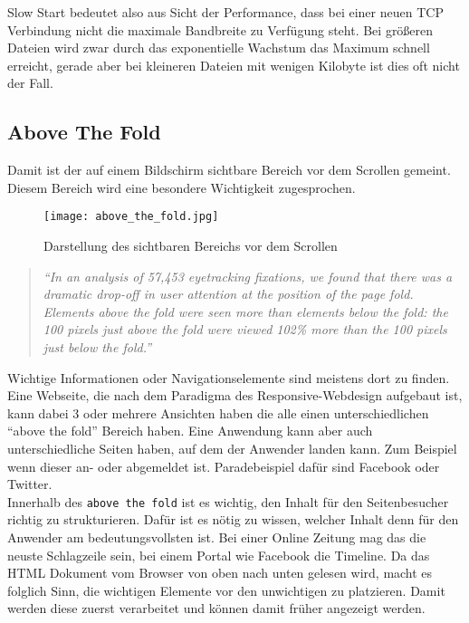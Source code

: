 		Slow Start bedeutet also aus Sicht der Performance, dass bei einer neuen TCP Verbindung nicht die maximale Bandbreite zu Verfügung steht. Bei größeren Dateien wird zwar durch das exponentielle Wachstum das Maximum schnell erreicht, gerade aber bei kleineren Dateien mit wenigen Kilobyte ist dies oft nicht der Fall.


	\subsection{Above The Fold} %
	\label{sub:above_the_fold}
		Damit ist der auf einem Bildschirm sichtbare Bereich vor dem Scrollen gemeint. Diesem Bereich wird eine besondere Wichtigkeit zugesprochen.
		\begin{figure}[htbp]
			\begin{center}
				\texttt{[image: above\_the\_fold.jpg]}
				\caption{Darstellung des sichtbaren Bereichs vor dem Scrollen}
				\label{fig:above_the_fold}
			\end{center}
		\end{figure}

		\begin{quote}
			 \textit{"`In an analysis of 57,453 eyetracking fixations, we found that there was a dramatic drop-off in user attention at the position of the page fold. Elements above the fold were seen more than elements below the fold: the 100 pixels just above the fold were viewed 102\% more than the 100 pixels just below the fold."'} \autocite{nng15}
		\end{quote}

		Wichtige Informationen oder Navigationselemente sind meistens dort zu finden. Eine Webseite, die nach dem Paradigma des Responsive-Webdesign aufgebaut ist, kann dabei 3 oder mehrere Ansichten haben die alle einen unterschiedlichen "`above the fold"' Bereich haben. Eine Anwendung kann aber auch unterschiedliche Seiten haben, auf dem der Anwender landen kann. Zum Beispiel wenn dieser an- oder abgemeldet ist. Paradebeispiel dafür sind Facebook oder Twitter.\\

		Innerhalb des \texttt{above the fold} ist es wichtig, den Inhalt für den Seitenbesucher richtig zu strukturieren. Dafür ist es nötig zu wissen, welcher Inhalt denn für den Anwender am bedeutungsvollsten ist. Bei einer Online Zeitung mag das die neuste Schlagzeile sein, bei einem Portal wie Facebook die Timeline. Da das HTML Dokument vom Browser von oben nach unten gelesen wird, macht es folglich Sinn, die wichtigen Elemente vor den unwichtigen zu platzieren. Damit werden diese zuerst verarbeitet und können damit früher angezeigt werden.

